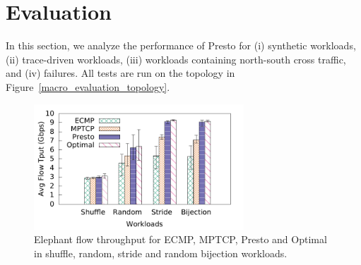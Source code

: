 \section{Evaluation}
\label{sec:eval}

In this section, we analyze the performance of Presto for (i) synthetic workloads, (ii)
trace-driven workloads, (iii) workloads containing north-south cross traffic, and (iv) failures.
All tests are run on the topology in Figure~\ref{macro_evaluation_topology}.
\begin{figure}[!t]
        \centering
  \includegraphics[width=0.7\textwidth]{presto/figures/macro/stride/macro_compare_tput_witherrbar.pdf}
        \caption{Elephant flow throughput for ECMP, MPTCP, Presto and Optimal in shuffle, random, stride and random bijection workloads.}
        \label{macro_evaluation_tput}
\end{figure}



